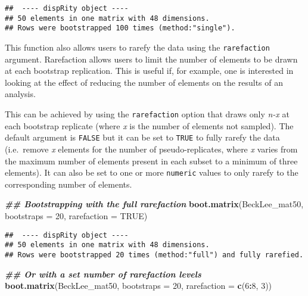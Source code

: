 \documentclass[
]{book}
\newenvironment{Shaded}{\begin{snugshade}}{\end{snugshade}}
\newcommand{\AttributeTok}[1]{\textcolor[rgb]{0.13,0.29,0.53}{#1}}
\newcommand{\ConstantTok}[1]{\textcolor[rgb]{0.56,0.35,0.01}{#1}}
\newcommand{\DecValTok}[1]{\textcolor[rgb]{0.00,0.00,0.81}{#1}}
\newcommand{\DocumentationTok}[1]{\textcolor[rgb]{0.56,0.35,0.01}{\textbf{\textit{#1}}}}
\newcommand{\FunctionTok}[1]{\textcolor[rgb]{0.13,0.29,0.53}{\textbf{#1}}}
\newcommand{\NormalTok}[1]{#1}
\newcommand{\SpecialCharTok}[1]{\textcolor[rgb]{0.81,0.36,0.00}{\textbf{#1}}}
\begin{document}
\begin{verbatim}
##  ---- dispRity object ---- 
## 50 elements in one matrix with 48 dimensions.
## Rows were bootstrapped 100 times (method:"single").
\end{verbatim}

This function also allows users to rarefy the data using the \texttt{rarefaction} argument.
Rarefaction allows users to limit the number of elements to be drawn at each bootstrap replication.
This is useful if, for example, one is interested in looking at the effect of reducing the number of elements on the results of an analysis.

This can be achieved by using the \texttt{rarefaction} option that draws only \emph{n-x} at each bootstrap replicate (where \emph{x} is the number of elements not sampled).
The default argument is \texttt{FALSE} but it can be set to \texttt{TRUE} to fully rarefy the data (i.e.~remove \emph{x} elements for the number of pseudo-replicates, where \emph{x} varies from the maximum number of elements present in each subset to a minimum of three elements).
It can also be set to one or more \texttt{numeric} values to only rarefy to the corresponding number of elements.

\begin{Shaded}
\begin{Highlighting}[]
\DocumentationTok{\#\# Bootstrapping with the full rarefaction}
\FunctionTok{boot.matrix}\NormalTok{(BeckLee\_mat50, }\AttributeTok{bootstraps =} \DecValTok{20}\NormalTok{,}
            \AttributeTok{rarefaction =} \ConstantTok{TRUE}\NormalTok{)}
\end{Highlighting}
\end{Shaded}

\begin{verbatim}
##  ---- dispRity object ---- 
## 50 elements in one matrix with 48 dimensions.
## Rows were bootstrapped 20 times (method:"full") and fully rarefied.
\end{verbatim}

\begin{Shaded}
\begin{Highlighting}[]
\DocumentationTok{\#\# Or with a set number of rarefaction levels}
\FunctionTok{boot.matrix}\NormalTok{(BeckLee\_mat50, }\AttributeTok{bootstraps =} \DecValTok{20}\NormalTok{,}
            \AttributeTok{rarefaction =} \FunctionTok{c}\NormalTok{(}\DecValTok{6}\SpecialCharTok{:}\DecValTok{8}\NormalTok{, }\DecValTok{3}\NormalTok{))}
\end{Highlighting}
\end{Shaded}
\end{document}

